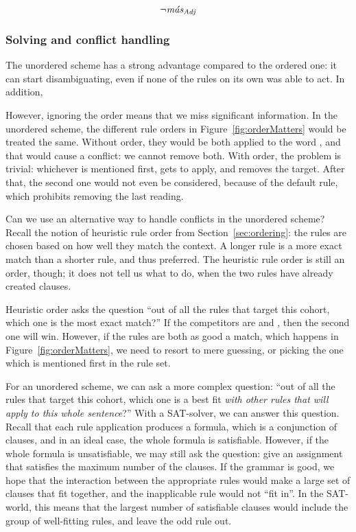 \begin{equation}
 \neg{}\text{\em m\'{a}s}_{\text{\em Adj}} 
\end{equation}


\subsubsection{Solving and conflict handling}


The unordered scheme has a strong advantage compared to the ordered one: it can start disambiguating, even if none of the rules on its own was able to act. In addition, 

However, ignoring the order means that we miss significant information. In the unordered scheme, the different rule orders in Figure~\ref{fig:orderMatters} would be treated the same. 
Without order, they would be both applied to the word \mas, and that would cause a conflict: we cannot remove both.
With order, the problem is trivial: whichever is mentioned first, gets to apply, and removes the target. After that, the second one would not even be considered, because of the default rule, which prohibits removing the last reading.

Can we use an alternative way to handle conflicts in the unordered scheme?
Recall the notion of heuristic rule order from Section~\ref{sec:ordering}: the rules are chosen based on how well they match the context. A longer rule is a more exact match than a shorter rule, and thus preferred. The heuristic rule order is still an order, though; it does not tell us what to do, when the two rules have already created clauses.

Heuristic order asks the question ``out of all the rules that target this cohort, which one is the most exact match?'' If the competitors are  and , then the second one will win. However, if the rules are both as good a match, which happens in Figure~\ref{fig:orderMatters}, we need to resort to mere guessing, or picking the one which is mentioned first in the rule set.

For an unordered scheme, we can ask a more complex question: ``out of all the rules that target this cohort, which one is a best fit \emph{with other rules that will apply to this whole sentence}?''
With a SAT-solver, we can answer this question. Recall that each rule application produces a formula, which is a conjunction of clauses, and in an ideal case, the whole formula is satisfiable. However, if the whole formula is unsatisfiable, we may still ask the question: give an assignment that satisfies the maximum number of the clauses. 
If the grammar is good, we hope that the interaction between the appropriate
rules would make a large set of clauses that fit together, and the
inapplicable rule would not ``fit in''.
In the SAT-world, this means that the largest number of satisfiable clauses would include the group of well-fitting rules, and leave the odd rule out.


